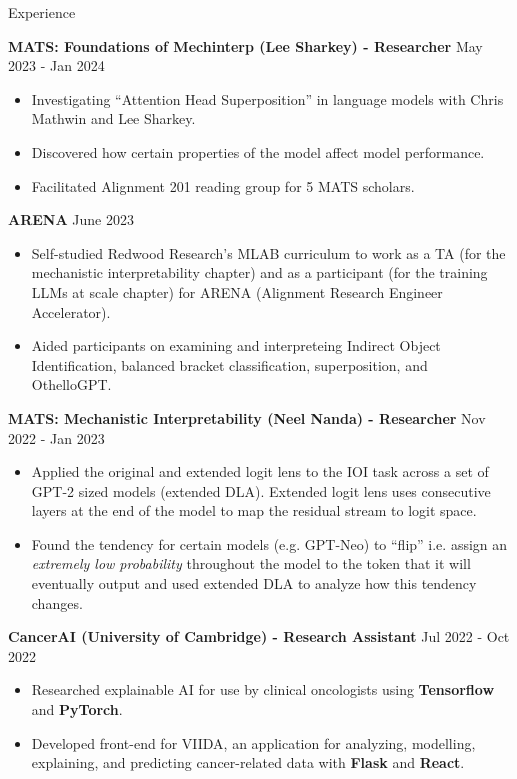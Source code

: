 \documentclass[hidelinks]{resume} %
\begin{document}
\begin{rSection}{Experience}

\textbf{MATS: Foundations of Mechinterp (Lee Sharkey) - Researcher}
\hfill {May 2023 - Jan 2024}
\begin{itemize}
    \item Investigating ``Attention Head Superposition'' in language models with Chris Mathwin and Lee Sharkey.
    \item Discovered how certain properties of the model affect model performance. 
    \item Facilitated Alignment 201 reading group for 5 MATS scholars.
\end{itemize}

\textbf{ARENA}
\hfill{June 2023}
\begin{itemize}
    \item Self-studied Redwood Research's MLAB curriculum to work as a TA (for the mechanistic interpretability chapter) and as a participant (for the training LLMs at scale chapter) for ARENA (Alignment Research Engineer Accelerator).
    \item Aided participants on examining and interpreteing Indirect Object Identification, balanced bracket classification, superposition, and OthelloGPT.
\end{itemize}

\textbf{MATS: Mechanistic Interpretability (Neel Nanda) - Researcher}
\hfill {Nov 2022 - Jan 2023}
\begin{itemize}
    \item Applied the original and extended logit lens to the IOI task across a set of GPT-2 sized models (extended DLA). Extended logit lens uses consecutive layers at the end of the model to map the residual stream to logit space.
    \item Found the tendency for certain models (e.g. GPT-Neo) to ``flip'' i.e. assign an \textit{extremely low probability} throughout the model to the token that it will eventually output and used extended DLA to analyze how this tendency changes.
\end{itemize}

\textbf{CancerAI (University of Cambridge) - Research Assistant}
\hfill {Jul 2022 - Oct 2022}
\begin{itemize}
    \item Researched explainable AI for use by clinical oncologists using \textbf{Tensorflow} and \textbf{PyTorch}.
    \item Developed front-end for VIIDA, an application for analyzing, modelling, explaining, and predicting cancer-related data with \textbf{Flask} and \textbf{React}.
\end{itemize}


\end{rSection}
\end{document}
